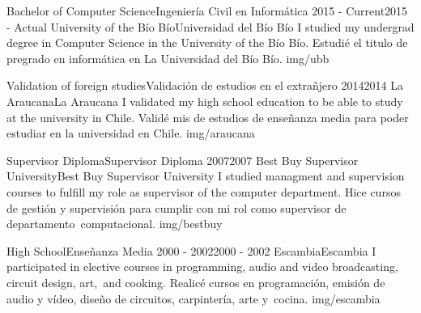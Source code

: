 \documentclass[paper=a4,fontsize=11pt]{includes}
\begin{document}
\sepspace

\EducationEntry
	{Bachelor of Computer Science}{Ingeniería Civil en Informática}
	{2015 - Current}{2015 - Actual}
	{University of the Bío Bío}{Universidad del Bío Bío}
	{I studied my undergrad degree in Computer Science in the University of the Bío Bío.}
	{Estudié el titulo de pregrado en informática en La Universidad del Bío Bío.}
	{img/ubb}

\sepspace

\EducationEntry
	{Validation of foreign studies}{Validación de estudios en el extrañjero}
	{2014}{2014}
	{La Araucana}{La Araucana}
	{I validated my high school education to be able to study at the university in Chile.}
	{Validé mis de estudios de enseñanza media para poder estudiar en la universidad en Chile.}
	{img/araucana}

\sepspace

\EducationEntry
	{Supervisor Diploma}{Supervisor Diploma}
	{2007}{2007}
	{Best Buy Supervisor University}{Best Buy Supervisor University}
	{I studied managment and supervision courses to fulfill my role as supervisor of the computer department.}
	{Hice cursos de gestión y supervisión para cumplir con mi rol como supervisor de departamento\
		computacional.}
	{img/bestbuy}

\sepspace

\EducationEntry
	{High School}{Enseñanza Media}
	{2000 - 2002}{2000 - 2002}
	{Escambia}{Escambia}
	{I participated in elective courses in programming, audio and video broadcasting, circuit design, art,\
		and cooking.}
	{Realicé cursos en programación, emisión de audio y vídeo, diseño de circuitos, carpintería, arte y\
		cocina.}
	{img/escambia}

\end{document}
